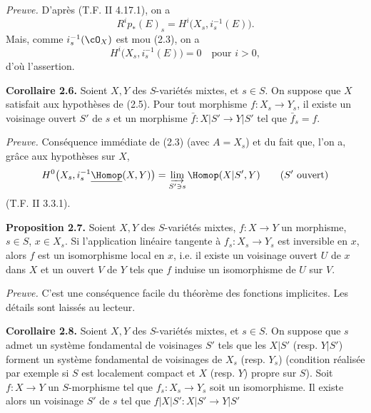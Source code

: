 \emph{Preuve.} D'après (T.F. II 4.17.1), on a
\[
  R^i p_*(E)_s=H^i\bigl(X_s,i_s^{-1}(E)\bigr).
\]
Mais, comme $i_s^{-1}(\cO_X)$ est mou (2.3), on a
\[
  H^i\bigl(X_s,i_s^{-1}(E)\bigr)=0\quad \text{pour } i>0,
\]
d'où l'assertion.

\textbf{Corollaire 2.6.} Soient $X,Y$ des $S$-variétés mixtes, et $s\in S$. On suppose que $X$ satisfait aux hypothèses de (2.5). Pour tout morphisme $f:X_s\to Y_s$, il existe un voisinage ouvert $S'$ de $s$ et un morphisme $\bar f:X|S'\longrightarrow Y|S'$ tel que $\bar f_s=f$.

\emph{Preuve.} Conséquence immédiate de (2.3) (avec $A=X_s$) et du fait que, l'on a, grâce aux hypothèses sur $X$,
\[
  H^0\bigl(X_s,i_s^{-1}\underline{\Homop}(X,Y)\bigr)
  =\varinjlim_{S'\ni s}\Homop(X|S',Y)\qquad (S'\ \text{ouvert})
\]
(T.F. II 3.3.1).

\textbf{Proposition 2.7.} Soient $X,Y$ des $S$-variétés mixtes, $f:X\to Y$ un morphisme, $s\in S$, $x\in X_s$. Si l'application linéaire tangente à $f_s:X_s\to Y_s$ est inversible en $x$, alors $f$ est un isomorphisme local en $x$, i.e. il existe un voisinage ouvert $U$ de $x$ dans $X$ et un ouvert $V$ de $Y$ tels que $f$ induise un isomorphisme de $U$ sur $V$.

\emph{Preuve.} C'est une conséquence facile du théorème des fonctions implicites. Les détails sont laissés au lecteur.

\textbf{Corollaire 2.8.} Soient $X,Y$ des $S$-variétés mixtes, et $s\in S$. On suppose que $s$ admet un système fondamental de voisinages $S'$ tels que les $X|S'$ (resp. $Y|S'$) forment un système fondamental de voisinages de $X_s$ (resp. $Y_s$) (condition réalisée par exemple si $S$ est localement compact et $X$ (resp. $Y$) propre sur $S$). Soit $f:X\to Y$ un $S$-morphisme tel que $f_s:X_s\to Y_s$ soit un isomorphisme. Il existe alors un voisinage $S'$ de $s$ tel que $f|X|S':X|S'\longrightarrow Y|S'$
